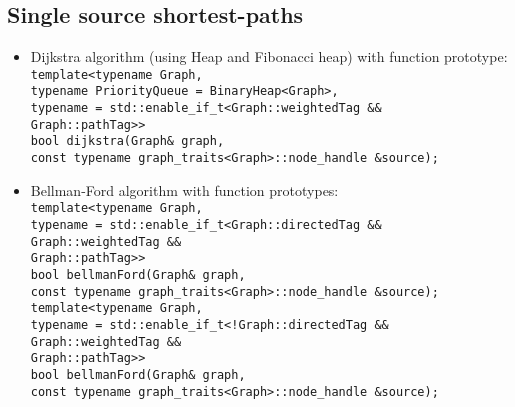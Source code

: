 \documentclass{article}
\begin{document}
\pagebreak

\subsection*{Single source shortest-paths}
\begin{itemize}
	\item Dijkstra algorithm (using Heap and Fibonacci heap) with function prototype:\\
		\texttt{template<typename Graph,\\\hspace*{4em}
				typename PriorityQueue = BinaryHeap<Graph>,\\\hspace*{4em}
				typename = std::enable\_if\_t<Graph::weightedTag \&\&\\\hspace*{17.8em}
				Graph::pathTag>>\\
			bool dijkstra(Graph\& graph,\\\hspace*{4.27em}
			const typename graph\_traits<Graph>::node\_handle \&source);}

	\item Bellman-Ford algorithm with function prototypes:\\
		\texttt{template<typename Graph,\\\hspace*{4em}
				typename = std::enable\_if\_t<Graph::directedTag \&\&\\\hspace*{17.8em}
											  Graph::weightedTag \&\&\\\hspace*{17.8em}
											  Graph::pathTag>>\\
			bool bellmanFord(Graph\& graph,\\\hspace*{8em}
			const typename graph\_traits<Graph>::node\_handle \&source);} \\

			\texttt{template<typename Graph,\\\hspace*{4em}
							 typename = std::enable\_if\_t<!Graph::directedTag \&\&\\\hspace*{17.8em}
														    Graph::weightedTag \&\&\\\hspace*{17.8em}
														    Graph::pathTag>>\\
			bool bellmanFord(Graph\& graph,\\\hspace*{8em}
			const typename graph\_traits<Graph>::node\_handle \&source);}


\end{itemize}
\end{document}
